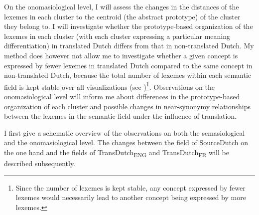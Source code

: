 On the onomasiological level, I will assess the changes in the distances of the lexemes in each cluster to the centroid (the abstract prototype) of the cluster they belong to. I will investigate whether the prototype-based organization of the lexemes in each cluster (with each cluster expressing a particular meaning differentiation) in translated Dutch differs from that in non-translated Dutch. My method does however not allow me to investigate whether a given concept is expressed by fewer lexemes in translated Dutch compared to the same concept in non-translated Dutch, because the total number of lexemes within each semantic field is kept stable over all visualizations (see )\footnote{Since the number of lexemes is kept stable, any concept expressed by fewer lexemes would necessarily lead to another concept being expressed by more lexemes.}. Observations on the onomasiological level will inform me about differences in the prototype-based organization of each cluster and possible changes in near-synonymy relationships between the lexemes in the semantic field under the influence of translation.

I first give a schematic overview of the observations on both the semasiological and the onomasiological level. The changes between the field of SourceDutch on the one hand and the fields of TransDutch\textsubscript{ENG} and TransDutch\textsubscript{FR} will be described subsequently.




